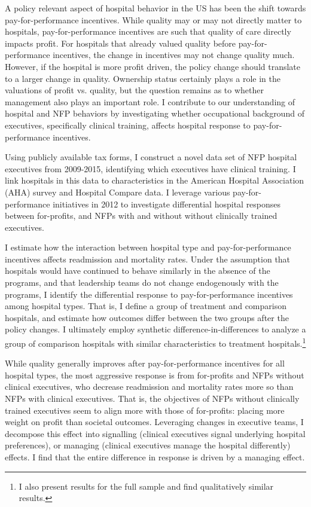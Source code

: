 \documentclass[12pt]{article}
\begin{document}
  A policy relevant aspect of hospital behavior in the US has been the shift towards pay-for-performance incentives. While quality may or may not directly matter to hospitals, pay-for-performance incentives are such that quality of care directly impacts profit. For hospitals that already valued quality before pay-for-performance incentives, the change in incentives may not change quality much. However, if the hospital is more profit driven, the policy change should translate to a larger change in quality. Ownership status certainly plays a role in the valuations of profit vs. quality, but the question remains as to whether management also plays an important role. I contribute to our understanding of hospital and NFP behaviors by investigating whether occupational background of executives, specifically clinical training, affects hospital response to pay-for-performance incentives.

  Using publicly available tax forms, I construct a novel data set of NFP hospital executives from 2009-2015, identifying which executives have clinical training. I link hospitals in this data to characteristics in the American Hospital Association (AHA) survey and Hospital Compare data. I leverage various pay-for-performance initiatives in 2012 to investigate differential hospital responses between for-profits, and NFPs with and without without clinically trained executives. 
  
  I estimate how the interaction between hospital type and pay-for-performance incentives affects readmission and mortality rates. Under the assumption that hospitals would have continued to behave similarly in the absence of the programs, and that leadership teams do not change endogenously with the programs, I identify the differential response to pay-for-performance incentives among hospital types. That is, I define a group of treatment and comparison hospitals, and estimate how outcomes differ between the two groups after the policy changes. I ultimately employ synthetic difference-in-differences to analyze a group of comparison hospitals with similar characteristics to treatment hospitals.\footnote{I also present results for the full sample and find qualitatively similar results.} 
  
   While quality generally improves after pay-for-performance incentives for all hospital types, the most aggressive response is from for-profits and NFPs without clinical executives, who decrease readmission and mortality rates more so than NFPs with clinical executives. That is, the objectives of NFPs without clinically trained executives seem to align more with those of for-profits: placing more weight on profit than societal outcomes. Leveraging changes in executive teams, I decompose this effect into signalling (clinical executives signal underlying hospital preferences), or managing (clinical executives manage the hospital differently) effects. I find that the entire difference in response is driven by a managing effect. 
\end{document}
